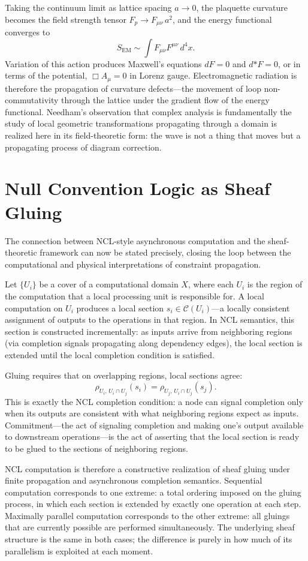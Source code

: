 \documentclass[12pt,a4paper,openany]{book}
\theoremstyle{plain}
\theoremstyle{definition}
\theoremstyle{remark}
\begin{document}
Taking the continuum limit as lattice spacing $a \to 0$, the plaquette curvature becomes the field strength tensor $F_p \to F_{\mu\nu} \, a^2$, and the energy functional converges to
\[
S_{\mathrm{EM}} \sim \int F_{\mu\nu} F^{\mu\nu} \, d^4x.
\]
Variation of this action produces Maxwell's equations $dF = 0$ and $d{*F} = 0$, or in terms of the potential, $\Box A_\mu = 0$ in Lorenz gauge. Electromagnetic radiation is therefore the propagation of curvature defects---the movement of loop non-commutativity through the lattice under the gradient flow of the energy functional. Needham's observation \cite{Needham1997} that complex analysis is fundamentally the study of local geometric transformations propagating through a domain is realized here in its field-theoretic form: the wave is not a thing that moves but a propagating process of diagram correction.

\section{Null Convention Logic as Sheaf Gluing}

The connection between NCL-style asynchronous computation and the sheaf-theoretic framework can now be stated precisely, closing the loop between the computational and physical interpretations of constraint propagation.

Let $\{U_i\}$ be a cover of a computational domain $X$, where each $U_i$ is the region of the computation that a local processing unit is responsible for. A local computation on $U_i$ produces a local section $s_i \in \mathcal{C}(U_i)$---a locally consistent assignment of outputs to the operations in that region. In NCL semantics, this section is constructed incrementally: as inputs arrive from neighboring regions (via completion signals propagating along dependency edges), the local section is extended until the local completion condition is satisfied.

Gluing requires that on overlapping regions, local sections agree:
\[
\rho_{U_i,\, U_i \cap U_j}(s_i) = \rho_{U_j,\, U_i \cap U_j}(s_j).
\]
This is exactly the NCL completion condition: a node can signal completion only when its outputs are consistent with what neighboring regions expect as inputs. Commitment---the act of signaling completion and making one's output available to downstream operations---is the act of asserting that the local section is ready to be glued to the sections of neighboring regions.

NCL computation is therefore a constructive realization of sheaf gluing under finite propagation and asynchronous completion semantics. Sequential computation corresponds to one extreme: a total ordering imposed on the gluing process, in which each section is extended by exactly one operation at each step. Maximally parallel computation corresponds to the other extreme: all gluings that are currently possible are performed simultaneously. The underlying sheaf structure is the same in both cases; the difference is purely in how much of its parallelism is exploited at each moment.
\end{document}
